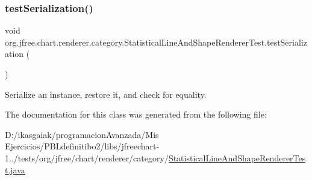 \subsubsection{\texorpdfstring{test\+Serialization()}{testSerialization()}}
{\footnotesize\ttfamily void org.\+jfree.\+chart.\+renderer.\+category.\+Statistical\+Line\+And\+Shape\+Renderer\+Test.\+test\+Serialization (\begin{DoxyParamCaption}{ }\end{DoxyParamCaption})}

Serialize an instance, restore it, and check for equality. 

The documentation for this class was generated from the following file\+:\begin{DoxyCompactItemize}
\item 
D\+:/ikasgaiak/programacion\+Avanzada/\+Mis Ejercicios/\+P\+B\+Ldefinitibo2/libs/jfreechart-\/1../tests/org/jfree/chart/renderer/category/\mbox{\hyperlink{_statistical_line_and_shape_renderer_test_8java}{Statistical\+Line\+And\+Shape\+Renderer\+Test.\+java}}\end{DoxyCompactItemize}
